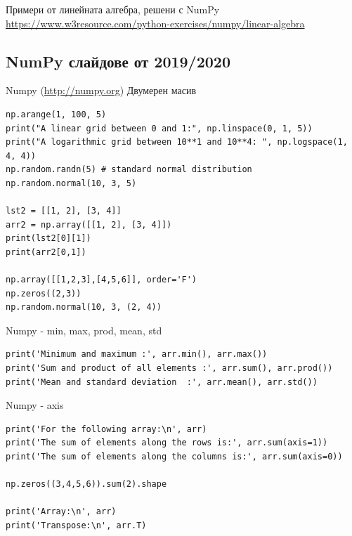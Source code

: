 \documentclass{beamer}
\begin{document}
\begin{frame}{Примери от линейната алгебра, решени с NumPy}
    \url{https://www.w3resource.com/python-exercises/numpy/linear-algebra}
\end{frame}



\subsection{NumPy слайдове от 2019/2020}







\begin{frame}[fragile]{Numpy (\url{http://numpy.org}) Двумерен масив}
\begin{lstlisting}
np.arange(1, 100, 5)
print("A linear grid between 0 and 1:", np.linspace(0, 1, 5))
print("A logarithmic grid between 10**1 and 10**4: ", np.logspace(1, 4, 4))
np.random.randn(5) # standard normal distribution
np.random.normal(10, 3, 5)

lst2 = [[1, 2], [3, 4]]
arr2 = np.array([[1, 2], [3, 4]])
print(lst2[0][1])
print(arr2[0,1])

np.array([[1,2,3],[4,5,6]], order='F')
np.zeros((2,3))
np.random.normal(10, 3, (2, 4))
\end{lstlisting}

\end{frame}


\begin{frame}[fragile]{Numpy - min, max, prod, mean, std }

\begin{lstlisting}
print('Minimum and maximum :', arr.min(), arr.max())
print('Sum and product of all elements :', arr.sum(), arr.prod())
print('Mean and standard deviation  :', arr.mean(), arr.std())
\end{lstlisting}

\end{frame}

\begin{frame}[fragile]{Numpy - axis }
\begin{lstlisting}
print('For the following array:\n', arr)
print('The sum of elements along the rows is:', arr.sum(axis=1))
print('The sum of elements along the columns is:', arr.sum(axis=0))

np.zeros((3,4,5,6)).sum(2).shape

print('Array:\n', arr)
print('Transpose:\n', arr.T)
\end{lstlisting}

\end{frame}
\end{document}

